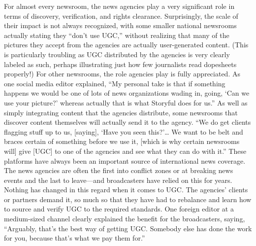 \begin{enumerate}
For almost every newsroom, the news agencies play a very significant role in
terms of discovery, verification, and rights clearance. Surprisingly, the scale
of their impact is not always recognized, with some smaller national newsrooms
actually stating they ``don't use UGC,'' without realizing that many
of the pictures they accept from the agencies are actually user-generated
content. (This is particularly troubling as UGC distributed by the agencies
is very clearly labeled as such, perhaps illustrating just how few journalists
read dopesheets properly!)
For other newsrooms, the role agencies play is fully appreciated. As one
social media editor explained, ``My personal take is that if something happens
we would be one of lots of news organizations wading in, going, ‘Can
we use your picture?' whereas actually that is what Storyful does for us.''
As well as simply integrating content that the agencies distribute, some
newsrooms that discover content themselves will actually send it to the
agency. ``We do get clients flagging stuff up to us, [saying], ‘Have you seen
this?'… We want to be belt and braces certain of something before we use
it, [which is why certain newsrooms will] give [UGC] to one of the agencies
and see what they can do with it.''
These platforms have always been an important source of international
news coverage. The news agencies are often the first into conflict zones or at
breaking news events and the last to leave—and broadcasters have relied on
this for years. Nothing has changed in this regard when it comes to UGC.
The agencies' clients or partners demand it, so much so that they have had
to rebalance and learn how to source and verify UGC to the required standards.
One foreign editor at a medium-sized channel clearly explained the
benefit for the broadcasters, saying, ``Arguably, that's the best way of getting
UGC. Somebody else has done the work for you, because that's what we pay
them for.''


\end{enumerate}
